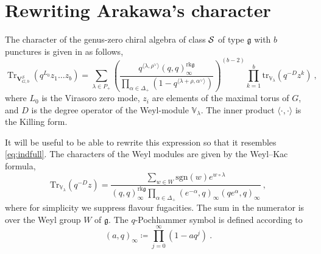 \documentclass[a4paper]{article}
\def\SS{{\cal S}}
\def\Tr{\mathop{\mathrm{Tr}}\nolimits}
\def\gf{\mathfrak{g}}
\begin{document}
\section{\label{app:rewriting_characters}Rewriting Arakawa's character}

The character of the genus-zero chiral algebra of class $\SS$ of type $\mathfrak{g}$ with $b$ punctures is given in \cite{Arakawa:2018egx} as follows,
\begin{equation}\label{eq:archarapp}
	\Tr_{\mathbf{V}_{G,b}^{\mathcal{S}}}(q^{L_0}z_1\dots z_b) =  \sum_{\lambda\in P_+} \left( \frac{q^{\langle\lambda,\rho^\vee\rangle} (q,q)_\infty^{\mathrm{rk}\mathfrak{g}}}{\prod_{\alpha\in\Delta_+} \left( 1-q^{\langle\lambda + \rho,\alpha^\vee\rangle} \right)}  \right)^{(b-2)} \prod_{k=1}^b \mathrm{tr}_{\mathbb{V}_\lambda}(q^{-D}z^k)~,
\end{equation}
where $L_0$ is the Virasoro zero mode, $z_i$ are elements of the maximal torus of $G$, and $D$ is the degree operator of the Weyl-module $\mathbb{V}_\lambda$. The inner product $ \langle \cdot,\cdot\rangle$ is the Killing form.

It will be useful to be able to rewrite this expression so that it resembles \eqref{eq:indfull}. The characters of the Weyl modules are given by the Weyl--Kac formula,
\begin{equation}
	\mathrm{Tr}_{\mathbb{V}_\lambda}(q^{-D}z) = \frac{\sum_{w\in W} \mathrm{sgn}(w) e^{w \circ \lambda}}{(q,q)_\infty^{\mathrm{rk}\mathfrak{g}} \prod_{\alpha\in\Delta_+}(e^{-\alpha},q)_\infty(qe^\alpha,q)_\infty}~,
\end{equation}
where for simplicity we suppress flavour fugacities. The sum in the numerator is over the Weyl group $W$ of $\gf$. The $q$-Pochhammer symbol is defined according to
\begin{equation}
	(a,q)_\infty \coloneqq \prod_{j=0}^{\infty} (1-aq^j)~.
\end{equation}
\end{document}
